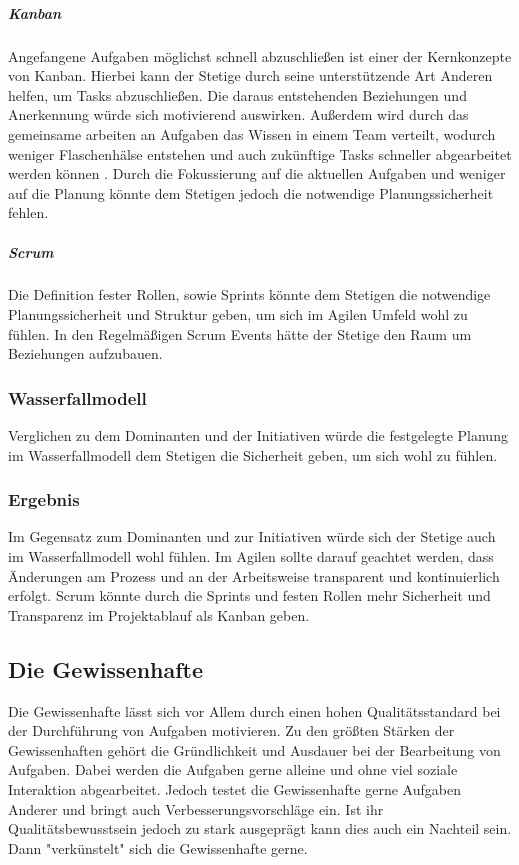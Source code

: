 \documentclass[twocolumn,10pt]{asme2ej}
\begin{document}
\subparagraph{Kanban} Angefangene Aufgaben möglichst schnell abzuschließen ist einer der Kernkonzepte von Kanban. Hierbei kann der Stetige durch seine unterstützende Art Anderen helfen, um Tasks abzuschließen. Die daraus entstehenden Beziehungen und Anerkennung würde sich motivierend auswirken. Außerdem wird durch das gemeinsame arbeiten an Aufgaben das Wissen in einem Team verteilt, wodurch weniger Flaschenhälse entstehen und auch zukünftige Tasks schneller abgearbeitet werden können \cite{kanban}. Durch die Fokussierung auf die aktuellen Aufgaben und weniger auf die Planung könnte dem Stetigen jedoch die notwendige Planungssicherheit fehlen.

\subparagraph{Scrum} Die Definition fester Rollen, sowie Sprints könnte dem Stetigen die notwendige Planungssicherheit und Struktur geben, um sich im Agilen Umfeld wohl zu fühlen. In den Regelmäßigen Scrum Events hätte der Stetige den Raum um Beziehungen aufzubauen.

\subsubsection{Wasserfallmodell}
Verglichen zu dem Dominanten und der Initiativen würde die festgelegte Planung im Wasserfallmodell dem Stetigen die Sicherheit geben, um sich wohl zu fühlen. 

\subsubsection{Ergebnis}
Im Gegensatz zum Dominanten und zur Initiativen würde sich der Stetige auch im Wasserfallmodell wohl fühlen. Im Agilen sollte darauf geachtet werden, dass Änderungen am Prozess und an der Arbeitsweise transparent und kontinuierlich erfolgt. Scrum könnte durch die Sprints und festen Rollen mehr Sicherheit und Transparenz im Projektablauf als Kanban geben. 
 
\subsection{Die Gewissenhafte}
Die Gewissenhafte lässt sich vor Allem durch einen hohen Qualitätsstandard bei der Durchführung von Aufgaben motivieren. Zu den größten Stärken der Gewissenhaften gehört die Gründlichkeit und Ausdauer bei der Bearbeitung von Aufgaben. Dabei werden die Aufgaben gerne alleine und ohne viel soziale Interaktion abgearbeitet. Jedoch testet die Gewissenhafte gerne Aufgaben Anderer und bringt auch Verbesserungsvorschläge ein. Ist ihr Qualitätsbewusstsein jedoch zu stark ausgeprägt kann dies auch ein Nachteil sein. Dann "verkünstelt" sich die Gewissenhafte gerne.
\end{document}
